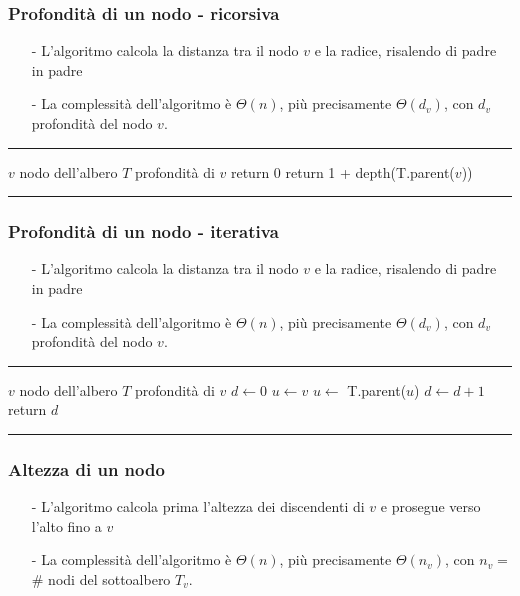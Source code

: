 \documentclass[a4paper]{article}
\makeatletter
\newenvironment{algo}[4]{
	\noindent\rule{\textwidth}{0.4pt}
	\begin{algorithmic}[1]
		\addtocounter{ALG@line}{-1}
		\Procedure{#1}{#2}
		\Require #3
		\Ensure #4
		\Statex }{
		\EndProcedure
	\end{algorithmic}
	\rule{\textwidth}{0.4pt}}
\makeatother
\begin{document}
\subsubsection*{Profondità di un nodo - ricorsiva}
\begin{itemize}[topsep=3pt, itemsep=0pt]
	\item[-] L'algoritmo calcola la distanza tra il nodo \(v\) e la radice, risalendo di padre in padre
	\item[-] La complessità dell'algoritmo è \(\Theta(n)\), più precisamente \(\Theta(d_v)\), con \(d_v\) profondità del nodo \(v\).
\end{itemize}

\begin{algo}{depth\_ric}{$v$}{$v$ nodo dell'albero $T$}{profondità di $v$}
		\State return 0
	\Else
		\State return 1 + depth(T.parent($v$))
	\EndIf
\end{algo}

\subsubsection*{Profondità di un nodo - iterativa}
\begin{itemize}[topsep=3pt, itemsep=0pt]
	\item[-] L'algoritmo calcola la distanza tra il nodo \(v\) e la radice, risalendo di padre in padre
	\item[-] La complessità dell'algoritmo è \(\Theta(n)\), più precisamente \(\Theta(d_v)\), con \(d_v\) profondità del nodo \(v\).
\end{itemize}

\begin{algo}{depth\_iter}{$v$}{$v$ nodo dell'albero $T$}{profondità di $v$}
	\State $d \gets 0$
	\State $u \gets v$
		\State $u \gets $ T.parent($u$)
		\State $d \gets d+1$
	\EndWhile
	\State return $d$
\end{algo}

\subsubsection*{Altezza di un nodo}
\begin{itemize}[topsep=3pt, itemsep=0pt]
	\item[-] L'algoritmo calcola prima l'altezza dei discendenti di \(v\) e prosegue verso l'alto fino a \(v\)
	\item[-] La complessità dell'algoritmo è \(\Theta(n)\), più precisamente \(\Theta(n_v)\), con \(n_v=\) \# nodi del sottoalbero \(T_v\).
\end{itemize}
\end{document}
